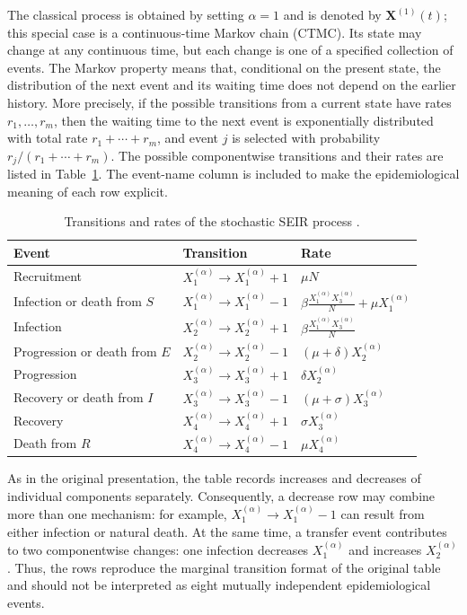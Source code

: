 \documentclass[00-main.tex]{subfiles}
\begin{document}
The classical process is obtained by setting $\alpha=1$ and is denoted by $\boldsymbol{X}^{(1)}(t)$; this special case is a continuous-time Markov chain (CTMC).
Its state may change at any continuous time, but each change is one of a specified collection of events.
The Markov property means that, conditional on the present state, the distribution of the next event and its waiting time does not depend on the earlier history.
More precisely, if the possible transitions from a current state have rates $r_1,\ldots,r_m$, then the waiting time to the next event is exponentially distributed with total rate $r_1+\cdots+r_m$, and event $j$ is selected with probability $r_j/(r_1+\cdots+r_m)$.
The possible componentwise transitions and their rates are listed in Table~\ref{tab:ch3-ctmc-transitions}.
The event-name column is included to make the epidemiological meaning of each row explicit.

\begin{table}[H]
\centering
\caption{Transitions and rates of the stochastic SEIR process \cite{Is20}.}
\label{tab:ch3-ctmc-transitions}
\begin{tabular}{lll}
\toprule
Event & Transition & Rate \\
\midrule
Recruitment & $X_1^{(\alpha)}\to X_1^{(\alpha)}+1$ & $\mu N$ \\[3pt]
Infection or death from $S$ & $X_1^{(\alpha)}\to X_1^{(\alpha)}-1$ & $\displaystyle \beta\frac{X_1^{(\alpha)}X_3^{(\alpha)}}{N}+\mu X_1^{(\alpha)}$ \\[6pt]
Infection & $X_2^{(\alpha)}\to X_2^{(\alpha)}+1$ & $\displaystyle \beta\frac{X_1^{(\alpha)}X_3^{(\alpha)}}{N}$ \\[6pt]
Progression or death from $E$ & $X_2^{(\alpha)}\to X_2^{(\alpha)}-1$ & $(\mu+\delta)X_2^{(\alpha)}$ \\[3pt]
Progression & $X_3^{(\alpha)}\to X_3^{(\alpha)}+1$ & $\delta X_2^{(\alpha)}$ \\[3pt]
Recovery or death from $I$ & $X_3^{(\alpha)}\to X_3^{(\alpha)}-1$ & $(\mu+\sigma)X_3^{(\alpha)}$ \\[3pt]
Recovery & $X_4^{(\alpha)}\to X_4^{(\alpha)}+1$ & $\sigma X_3^{(\alpha)}$ \\[3pt]
Death from $R$ & $X_4^{(\alpha)}\to X_4^{(\alpha)}-1$ & $\mu X_4^{(\alpha)}$ \\
\bottomrule
\end{tabular}
\end{table}

As in the original presentation, the table records increases and decreases of individual components separately.
Consequently, a decrease row may combine more than one mechanism: for example, $X_1^{(\alpha)}\to X_1^{(\alpha)}-1$ can result from either infection or natural death.
At the same time, a transfer event contributes to two componentwise changes: one infection decreases $X_1^{(\alpha)}$ and increases $X_2^{(\alpha)}$.
Thus, the rows reproduce the marginal transition format of the original table and should not be interpreted as eight mutually independent epidemiological events.
\end{document}
